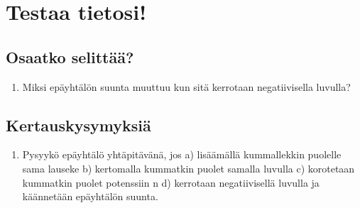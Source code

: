 
\section{Testaa tietosi!}

\subsection*{Osaatko selittää?}
\begin{enumerate}
 \item Miksi epäyhtälön suunta muuttuu kun sitä kerrotaan negatiivisella luvulla?
\end{enumerate}

\subsection*{Kertauskysymyksiä}
\begin{enumerate}
 \item Pysyykö epäyhtälö yhtäpitävänä, jos
a) lisäämällä kummallekkin puolelle sama lauseke
b) kertomalla kummatkin puolet samalla luvulla
c) korotetaan kummatkin puolet potenssiin n
d) kerrotaan negatiivisellä luvulla ja käännetään epäyhtälön suunta.
\end{enumerate}